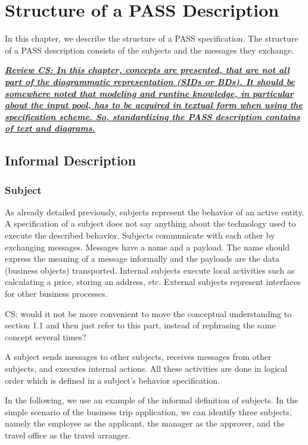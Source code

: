 
\chapter{Structure of a PASS Description}
\label{PASSStruct}

In this chapter, we describe the structure of a PASS specification. The structure of a PASS description consists of the subjects and the messages they exchange.

\emph{\underline{\textit{\textbf{Review CS: In this chapter, concepts are presented, that are not all part of the diagrammatic representation (SIDs or BDs). It should be somewhere noted that modeling and runtine knowledge, in particular about the input pool, has to be acquired in textual form when using the specification scheme. So, standardizing the PASS description contains of text and diagrams.}}}}

\section{Informal Description}
\subsection{Subject}
\label{sec: Subject}

As already detailed previously, subjects represent the behavior of an active entity. A specification of a subject does not say anything about the technology used to execute the described behavior. Subjects communicate with each other by exchanging messages. Messages have a name and a payload. The name should express the meaning of a message informally and the payloads are the data (business objects) transported. Internal subjects execute local activities such as calculating a price, storing an address, etc. External subjects represent interfaces for other business processes.

CS: would it not be more convenient to move the conceptual understanding to section 1.1 and then just refer to this part, instead of rephrasing the same concept several times?

A subject sends messages to other subjects, receives messages from other subjects, and executes internal actions. All these activities are done in logical order which is defined in a subject's behavior specification.

In the following, we use an example of the informal definition of subjects. In the simple scenario of the business trip application, we can identify three subjects, namely the employee as the applicant, the manager as the approver, and the travel office as the travel arranger.

